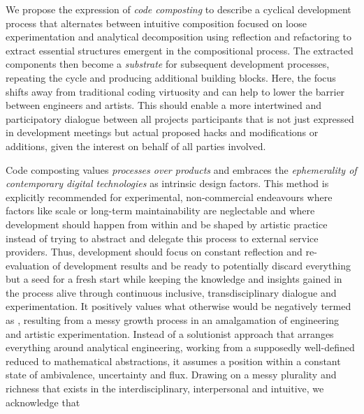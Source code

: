 We propose the expression of \emph{code composting} to describe a cyclical development process that alternates between intuitive composition focused on loose experimentation and analytical decomposition using reflection and refactoring to extract essential structures emergent in the compositional process.
The extracted components then become a \emph{substrate} for subsequent development processes, repeating the cycle and producing additional building blocks.
Here, the focus shifts away from traditional coding virtuosity and can help to lower the barrier between engineers and artists.
This should enable a more intertwined and participatory dialogue between all project\textquotesingle s participants that is not just expressed in development meetings but actual proposed hacks and modifications or additions, given the interest on behalf of all parties involved.

Code composting values \emph{processes over products} and embraces the \emph{ephemerality of contemporary digital technologies} as intrinsic design factors.
This method is explicitly recommended for experimental, non-commercial endeavours where factors like scale or long-term maintainability are neglectable and where development should happen from within and be shaped by artistic practice instead of trying to abstract and delegate this process to external service providers.
Thus, development should focus on constant reflection and re-evaluation of development results and be ready to potentially discard everything but a seed for a fresh start while keeping the knowledge and insights gained in the process alive through continuous inclusive, transdisciplinary dialogue and experimentation.
It positively values what otherwise would be negatively termed as , resulting from a messy growth process in an amalgamation of engineering and artistic experimentation.
Instead of a solutionist approach that arranges everything around analytical engineering, working from a supposedly well-defined  reduced to mathematical abstractions, it assumes a position within a constant state of ambivalence, uncertainty and flux.
Drawing on a messy plurality and richness that exists in the interdisciplinary, interpersonal and intuitive, we acknowledge that \parencite[][55]{harawayStayingWithTheTrouble}
